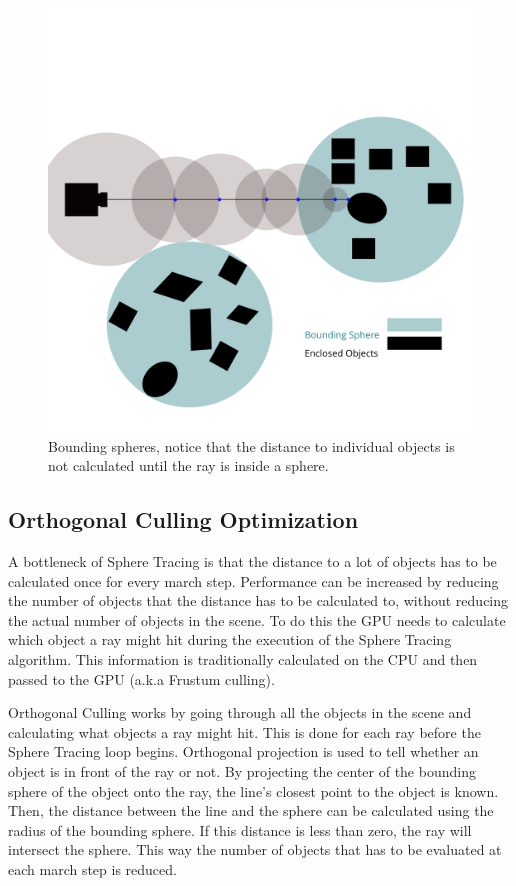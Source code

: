 			\begin{figure}[H]
				\centering
				\includegraphics[width=0.75\linewidth]{figure/BoundingSphere} 
				\caption{Bounding spheres, notice that the distance to individual objects 
					is not calculated until the ray is inside a sphere.}
			\end{figure}

		\subsection{Orthogonal Culling Optimization}

			A bottleneck of Sphere Tracing is that the distance to a lot of objects
			has to be calculated once for every march step. Performance can be
			increased by reducing the number of objects that the distance has to be
			calculated to, without reducing the actual number of objects in the
			scene. To do this the GPU needs to calculate which object a ray might hit
			during the execution of the Sphere Tracing algorithm. This information is
			traditionally calculated on the CPU and then passed to the GPU (a.k.a
			Frustum culling\cite{frustum}).

			Orthogonal Culling works by going through all the objects in the scene
			and calculating what objects a ray might hit. This is done for each ray
			before the Sphere Tracing loop begins. Orthogonal projection is used to
			tell whether an object is in front of the ray or not. By projecting the
			center of the bounding sphere of the object onto the ray, the line's
			closest point to the object is known. Then, the distance between the line
			and the sphere can be calculated using the radius of the bounding sphere.
			If this distance is less than zero, the ray will intersect the sphere.
			This way the number of objects that has to be evaluated at each march
			step is reduced. 

